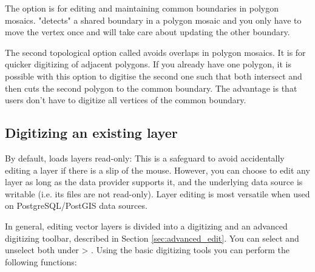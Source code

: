 
The option  is for editing and maintaining 
common boundaries in polygon mosaics. \qg "detects" a shared boundary in 
a polygon mosaic and you only have to move the vertex once and \qg will take 
care about updating the other boundary.


The second topological option called  
avoids overlaps in polygon mosaics. It is for quicker digitizing of adjacent polygons. 
If you already have one polygon, it is possible with this option to digitise the second 
one such that both intersect and \qg then cuts the second polygon to the common boundary. 
The advantage is that users don't have to digitize all vertices of the common boundary.

\subsection{Digitizing an existing layer}
\label{sec:edit_existing_layer}

By default, \qg loads layers read-only: This is a safeguard
to avoid accidentally editing a layer if there is a slip of the mouse.
However, you can choose to edit any layer as long as the data provider
supports it, and the underlying data source is writable (i.e. its files are
not read-only). Layer editing is most versatile when used on
PostgreSQL/PostGIS data sources.

In general, editing vector layers is divided into a digitizing and an advanced
digitizing toolbar, described in Section \ref{sec:advanced_edit}. You can
select and unselect both under  > .
Using the basic digitizing tools you can perform the following functions:

